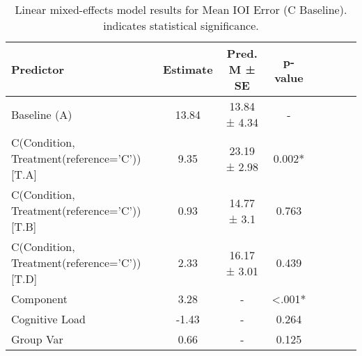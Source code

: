 
    \begin{table}[H]
    \centering
    \begin{small}
    \begin{tabular}{lccccccc}
\toprule
Predictor & Estimate & Pred. M ± SE & p-value \\
\midrule
Baseline (A) & 13.84 & 13.84 ± 4.34 & - \\
C(Condition, Treatment(reference='C'))[T.A] & 9.35 & 23.19 ± 2.98 & 0.002* \\
C(Condition, Treatment(reference='C'))[T.B] & 0.93 & 14.77 ± 3.1 & 0.763 \\
C(Condition, Treatment(reference='C'))[T.D] & 2.33 & 16.17 ± 3.01 & 0.439 \\
Component & 3.28 & - & <.001* \\
Cognitive Load & -1.43 & - & 0.264 \\
Group Var & 0.66 & - & 0.125 \\
\bottomrule
\end{tabular}

    \end{small}
    \caption[Linear mixed-effects model results for Mean IOI Error (C Baseline)]{Linear mixed-effects model results for Mean IOI Error (C Baseline). \newline * indicates statistical significance.}
    \label{tab:meanioierror (c baseline)}

    \end{table}